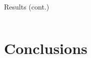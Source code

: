 \documentclass[aspectratio=169,xcolor=dvipsnames,handout]{beamer}
\begin{document}
\begin{frame}{Results (cont.)}
\begin{columns}[c]




        
    \end{columns}
\end{frame}

\section{Conclusions}
\end{document}
